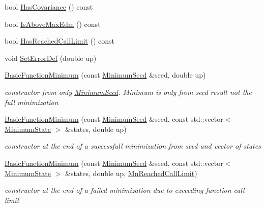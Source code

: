 \begin{DoxyCompactItemize}
\item 
bool \mbox{\hyperlink{classROOT_1_1Minuit2_1_1BasicFunctionMinimum_ac876224368add09ceab711d3515fd959}{Has\+Covariance}} () const
\item 
bool \mbox{\hyperlink{classROOT_1_1Minuit2_1_1BasicFunctionMinimum_a6c37206680e19443048e8b398ef5ced8}{Is\+Above\+Max\+Edm}} () const
\item 
bool \mbox{\hyperlink{classROOT_1_1Minuit2_1_1BasicFunctionMinimum_ab26a12c388b15f056c9effa0abcd7639}{Has\+Reached\+Call\+Limit}} () const
\item 
void \mbox{\hyperlink{classROOT_1_1Minuit2_1_1BasicFunctionMinimum_ae89163fbfaccda743a6ca8d3add896dc}{Set\+Error\+Def}} (double up)
\item 
\mbox{\hyperlink{classROOT_1_1Minuit2_1_1BasicFunctionMinimum_a7482d18115a4dc6cd3a0690074c7bbb7}{Basic\+Function\+Minimum}} (const \mbox{\hyperlink{classROOT_1_1Minuit2_1_1MinimumSeed}{Minimum\+Seed}} \&seed, double up)
\begin{DoxyCompactList}\small\item\em constructor from only \mbox{\hyperlink{classROOT_1_1Minuit2_1_1MinimumSeed}{Minimum\+Seed}}. Minimum is only from seed result not the full minimization \end{DoxyCompactList}\item 
\mbox{\hyperlink{classROOT_1_1Minuit2_1_1BasicFunctionMinimum_a8a2f91243b896e3fe682c19ccd57a9bc}{Basic\+Function\+Minimum}} (const \mbox{\hyperlink{classROOT_1_1Minuit2_1_1MinimumSeed}{Minimum\+Seed}} \&seed, const std\+::vector$<$ \mbox{\hyperlink{classROOT_1_1Minuit2_1_1MinimumState}{Minimum\+State}} $>$ \&states, double up)
\begin{DoxyCompactList}\small\item\em constructor at the end of a successfull minimization from seed and vector of states \end{DoxyCompactList}\item 
\mbox{\hyperlink{classROOT_1_1Minuit2_1_1BasicFunctionMinimum_a2a15d2336acfb9f3be41de8e477c191a}{Basic\+Function\+Minimum}} (const \mbox{\hyperlink{classROOT_1_1Minuit2_1_1MinimumSeed}{Minimum\+Seed}} \&seed, const std\+::vector$<$ \mbox{\hyperlink{classROOT_1_1Minuit2_1_1MinimumState}{Minimum\+State}} $>$ \&states, double up, \mbox{\hyperlink{classROOT_1_1Minuit2_1_1BasicFunctionMinimum_1_1MnReachedCallLimit}{Mn\+Reached\+Call\+Limit}})
\begin{DoxyCompactList}\small\item\em constructor at the end of a failed minimization due to exceeding function call limit \end{DoxyCompactList}\item 

\end{DoxyCompactItemize}
